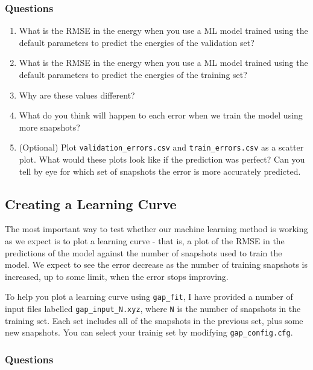 \documentclass{article}
\begin{document}
\subsubsection*{Questions}

\begin{enumerate}
 
\item What is the RMSE in the energy when you use a ML model trained using the default parameters to predict the energies of the validation set?
\item What is the RMSE in the energy when you use a ML model trained using the default parameters to predict the energies of the training set?
\item Why are these values different?
\item What do you think will happen to each error when we train the model using more snapshots?
\item (Optional) Plot \verb|validation_errors.csv| and \verb|train_errors.csv| as a scatter plot. What would these plots look like if the prediction was perfect? Can you tell by eye for which set of snapshots the error is more accurately predicted.

\end{enumerate}

\subsection{Creating a Learning Curve}

The most important way to test whether our machine learning method is working as we expect is to plot a learning curve - that is, a plot of the RMSE in the predictions of the model against the number of snapshots used to train the model. We expect to see the error decrease as the number of training snapshots is increased, up to some limit, when the error stops improving.

To help you plot a learning curve using \verb|gap_fit|, I have provided a number of input files labelled \verb|gap_input_N.xyz|, where \verb|N| is the number of snapshots in the training set. Each set includes all of the snapshots in the previous set, plus some new snapshots. You can select your trainig set by modifying \verb|gap_config.cfg|.

\subsubsection*{Questions}
\end{document}
